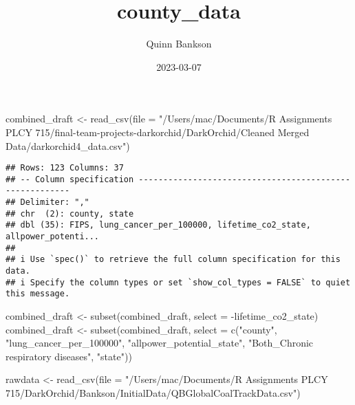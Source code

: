 \documentclass[
]{article}
\title{county\_data}
\author{Quinn Bankson}
\date{2023-03-07}
\newenvironment{Shaded}{\begin{snugshade}}{\end{snugshade}}
\newcommand{\AttributeTok}[1]{\textcolor[rgb]{0.77,0.63,0.00}{#1}}
\newcommand{\FunctionTok}[1]{\textcolor[rgb]{0.00,0.00,0.00}{#1}}
\newcommand{\NormalTok}[1]{#1}
\newcommand{\OtherTok}[1]{\textcolor[rgb]{0.56,0.35,0.01}{#1}}
\newcommand{\SpecialCharTok}[1]{\textcolor[rgb]{0.00,0.00,0.00}{#1}}
\newcommand{\StringTok}[1]{\textcolor[rgb]{0.31,0.60,0.02}{#1}}
\begin{document}
\maketitle

\begin{Shaded}
\begin{Highlighting}[]
\NormalTok{combined\_draft }\OtherTok{\textless{}{-}} \FunctionTok{read\_csv}\NormalTok{(}\AttributeTok{file =} \StringTok{"/Users/mac/Documents/R Assignments PLCY 715/final{-}team{-}projects{-}darkorchid/DarkOrchid/Cleaned Merged Data/darkorchid4\_data.csv"}\NormalTok{)}
\end{Highlighting}
\end{Shaded}

\begin{verbatim}
## Rows: 123 Columns: 37
## -- Column specification --------------------------------------------------------
## Delimiter: ","
## chr  (2): county, state
## dbl (35): FIPS, lung_cancer_per_100000, lifetime_co2_state, allpower_potenti...
## 
## i Use `spec()` to retrieve the full column specification for this data.
## i Specify the column types or set `show_col_types = FALSE` to quiet this message.
\end{verbatim}

\begin{Shaded}
\begin{Highlighting}[]
\NormalTok{combined\_draft }\OtherTok{\textless{}{-}} \FunctionTok{subset}\NormalTok{(combined\_draft, }\AttributeTok{select =} \SpecialCharTok{{-}}\NormalTok{lifetime\_co2\_state)}
\NormalTok{combined\_draft }\OtherTok{\textless{}{-}} \FunctionTok{subset}\NormalTok{(combined\_draft, }\AttributeTok{select =} \FunctionTok{c}\NormalTok{(}\StringTok{"county"}\NormalTok{, }\StringTok{"lung\_cancer\_per\_100000"}\NormalTok{, }
\StringTok{"allpower\_potential\_state"}\NormalTok{, }\StringTok{"Both\_Chronic respiratory diseases"}\NormalTok{, }\StringTok{"state"}\NormalTok{)) }
\end{Highlighting}
\end{Shaded}

\begin{Shaded}
\begin{Highlighting}[]
\NormalTok{rawdata }\OtherTok{\textless{}{-}} \FunctionTok{read\_csv}\NormalTok{(}\AttributeTok{file =} \StringTok{"/Users/mac/Documents/R Assignments PLCY 715/DarkOrchid/Bankson/InitialData/QBGlobalCoalTrackData.csv"}\NormalTok{)}
\end{Highlighting}
\end{Shaded}
\end{document}
